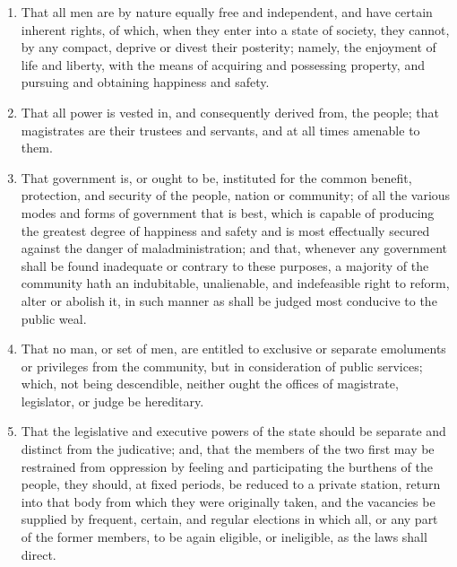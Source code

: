 \begin{enumerate}
  \item That all men are by nature equally free and independent, and have certain
    inherent rights, of which, when they enter into a state of society, they cannot, by any compact, deprive
    or divest their posterity; namely, the enjoyment of life and liberty, with the means of acquiring and
    possessing property, and pursuing and obtaining happiness and safety.

  \item That all power is vested in, and consequently derived from, the people; that magistrates are their trustees
    and servants, and at all times amenable to them.

  \item That government is, or ought to be, instituted for the common benefit, protection, and security of the people,
    nation or community; of all the various modes and forms of government that is best, which is capable of
    producing the greatest degree of happiness and safety and is most effectually secured against the danger
    of maladministration; and that, whenever any government shall be found inadequate or contrary to these
    purposes, a majority of the community hath an indubitable, unalienable, and indefeasible right to reform,
    alter or abolish it, in such manner as shall be judged most conducive to the public weal.

  \item That no man, or set of men, are entitled to exclusive or separate emoluments or privileges from the community,
    but in consideration of public services; which, not being descendible, neither ought the offices of magistrate,
    legislator, or judge be hereditary.

  \item That the legislative and executive powers of the state should be separate and distinct from the judicative;
    and, that the members of the two first may be restrained from oppression by feeling and participating the
    burthens of the people, they should, at fixed periods, be reduced to a private station, return into that body
    from which they were originally taken, and the vacancies be supplied by frequent, certain, and regular elections
    in which all, or any part of the former members, to be again eligible, or ineligible, as the laws shall direct.
\end{enumerate}


